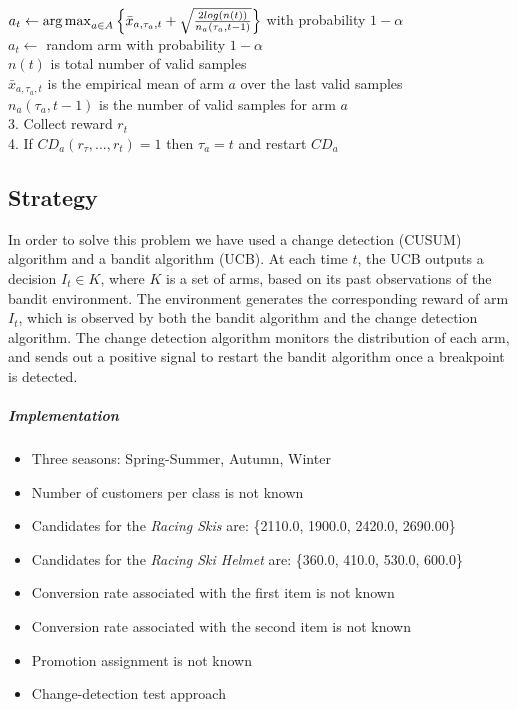 \hspace{0.8cm} $a_{t} \leftarrow \operatorname{arg\,max}_{a \in A}{\left\{\bar{x}_{a,\tau_{a},t} + \sqrt{\frac{2 log(n(t))}{{n_{a}(\tau_{a},t-1)}} }\right\}}$ with probability $1-\alpha$\\

\hspace{0.8cm} $a_{t} \leftarrow$ random arm with probability $1-\alpha$ \\

$n(t)$	is total number of valid samples\\

$\bar{x}_{a,\tau_{a},t}$ is the empirical mean of arm $a$ over the last valid samples\\

$n_{a}(\tau_{a},t-1)$ is the number of valid samples for arm $a$\\

3. Collect reward $r_t$\\

4. If $CD_a (r_{\tau},...,r_t) = 1$ then $\tau_a = t$ and restart $CD_a$


\subsection*{Strategy}
In order to solve this problem we have used a change detection (CUSUM) algorithm and a bandit algorithm (UCB). At each time $t$, the UCB outputs a decision $I_t \in K$, where $K$ is a set of arms, based on its past observations of the bandit environment. The environment generates the corresponding reward of arm $I_t$, which is observed by both the bandit algorithm and the change detection algorithm. The change detection algorithm monitors the distribution of each arm, and sends out a positive signal to restart the bandit algorithm once a breakpoint is detected.

\subparagraph{Implementation}
\begin{itemize}
	\item Three seasons: Spring-Summer, Autumn, Winter
	\item Number of customers per class is not known 
	\item Candidates for the \textit{Racing Skis} are: \{2110.0, 1900.0, 2420.0, 2690.00\}
	\item Candidates for the \textit{Racing Ski Helmet} are: \{360.0, 410.0, 530.0, 600.0\}
	\item Conversion rate associated with the first item is not known
	\item Conversion rate associated with the second item is not known
	\item Promotion assignment is not known 
	\item Change-detection test approach
\end{itemize} 

